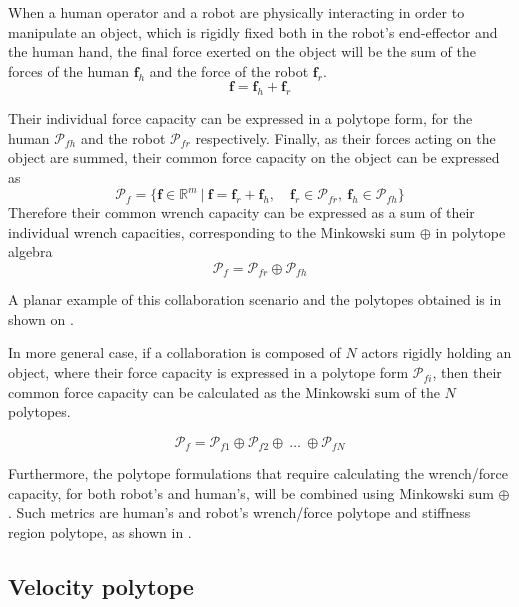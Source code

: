 When a human operator and a robot are physically interacting in order to manipulate an object, which is rigidly fixed both in the robot's end-effector and the human hand, the final force exerted on the object will be the sum of the forces of the human $\bm{f}_h$ and the force of the robot $\bm{f}_r$.
\begin{equation}
    \bm{f} = \bm{f}_h + \bm{f}_r
\end{equation}

Their individual force capacity can be expressed in a polytope form, for the human  $\mathcal{P}_{fh}$ and the robot  $\mathcal{P}_{fr}$ respectively. Finally, as their forces acting on the object are summed, their common force capacity on the object can be expressed as
\begin{equation}
    \mathcal{P}_f = \{\bm{f}\in \mathbb{R}^m ~|~\bm{f} = \bm{f}_r + \bm{f}_h , \quad\bm{f}_r \in \mathcal{P}_{fr},~\bm{f}_h \in \mathcal{P}_{fh}\}
\end{equation}
Therefore their common wrench capacity can be expressed as a sum of their individual wrench capacities, corresponding to the Minkowski sum $\oplus$ in polytope algebra 
\begin{equation}
    \mathcal{P}_f = \mathcal{P}_{fr}\oplus \mathcal{P}_{fh}
\end{equation}

A planar example of this collaboration scenario and the polytopes obtained is in shown on . 

In more general case, if a collaboration is composed of $N$ actors rigidly holding an object, where their force capacity is expressed in a polytope form $\mathcal{P}_{fi}$, then their common force capacity can be calculated as the Minkowski sum of the $N$ polytopes.

\begin{equation}
    \mathcal{P}_f =  \mathcal{P}_{f1} \oplus \mathcal{P}_{f2} \oplus ~\ldots ~\oplus  \mathcal{P}_{fN}
\end{equation}

Furthermore, the polytope formulations that require calculating the wrench/force capacity, for both robot's and human's, will be combined using Minkowski sum $\oplus$. Such metrics are human's and robot's wrench/force polytope and stiffness region polytope, as shown in .

\subsection{Velocity polytope}
\label{ch:velocity_collab}

